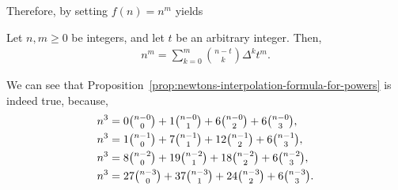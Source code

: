 Therefore, by setting $f(n)=n^m$ yields

\begin{proposition}
  \label{prop:newtons-interpolation-formula-for-powers}
  Let $n,m\ge 0$ be integers, and let $t$ be an arbitrary integer. Then,
  \begin{align*}
    n^m = \sum_{k=0}^{m} \binom{n-t}{k} \Delta^{k} t^m.
  \end{align*}
\end{proposition}

We can see that Proposition~\eqref{prop:newtons-interpolation-formula-for-powers}
is indeed true, because,
\begin{align*}
  n^3 &= 0 \tbinom{n-0}{0}  + 1 \tbinom{n-0}{1}  + 6 \tbinom{n-0}{2}  + 6 \tbinom{n-0}{3}, \\
  n^3 &= 1 \tbinom{n-1}{0}  + 7 \tbinom{n-1}{1}  + 12 \tbinom{n-1}{2} + 6 \tbinom{n-1}{3}, \\
  n^3 &= 8 \tbinom{n-2}{0}  + 19 \tbinom{n-2}{1} + 18 \tbinom{n-2}{2} + 6 \tbinom{n-2}{3}, \\
  n^3 &= 27 \tbinom{n-3}{0} + 37 \tbinom{n-3}{1} + 24 \tbinom{n-3}{2} + 6 \tbinom{n-3}{3}.
\end{align*}

